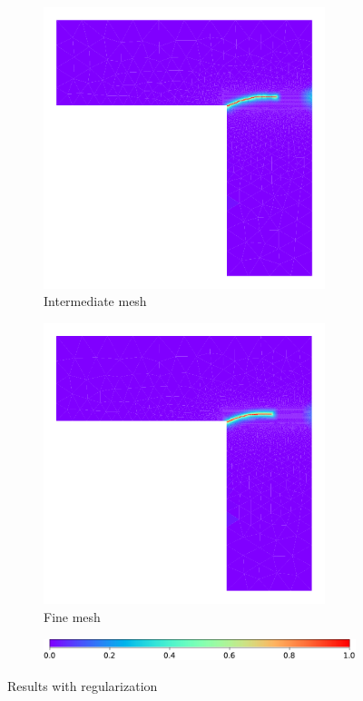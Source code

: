 \documentclass[10pt]{elsarticle}
\begin{document}
\begin{figure}[ht]
\begin{subfigure}{0.32\textwidth}
		\includegraphics[width=0.9\textwidth]{./Images/L/damage_inter.pdf}
		\caption{Intermediate mesh}
	\end{subfigure}
	\hfill
	\begin{subfigure}{0.32\textwidth}
		\centering
		\includegraphics[width=0.9\textwidth]{./Images/L/damage_fine.pdf}
		\caption{Fine mesh}
	\end{subfigure}
	\begin{subfigure}{\textwidth}
		\centering
		\vfill
		\includegraphics[width=0.4\linewidth]{./Images/L/cb.pdf}
	\end{subfigure}
	\caption{Results with regularization}
	\label{fig:Results_with_ration}
\end{figure}
\end{document}
